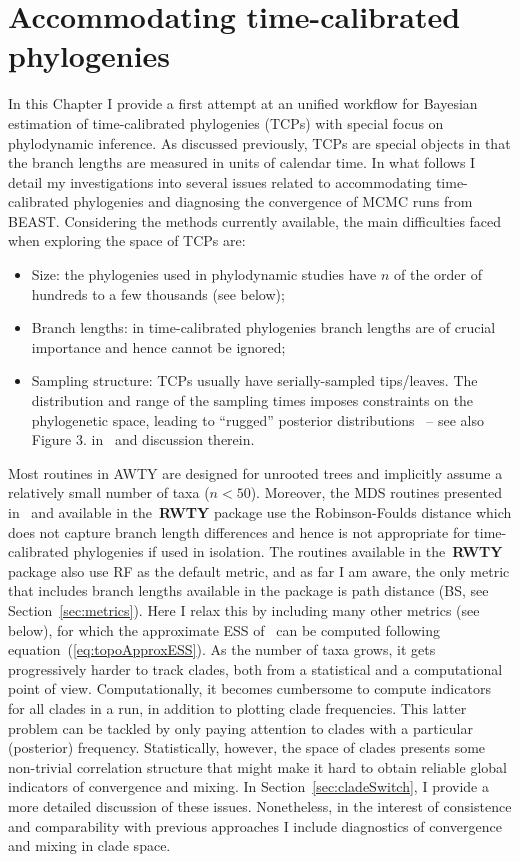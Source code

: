 \section{Accommodating time-calibrated phylogenies}
\label{sec:accommodating}

In this Chapter I provide a first attempt at an unified workflow for Bayesian estimation of time-calibrated phylogenies (TCPs) with special focus on phylodynamic inference.
As discussed previously, TCPs are special objects in that the branch lengths are measured in units of calendar time.
In what follows I detail my investigations into several issues related to accommodating time-calibrated phylogenies and diagnosing the convergence of MCMC runs from BEAST.
Considering the methods currently available, the main difficulties faced when exploring the space of TCPs are:
\begin{itemize}
 \item Size: the phylogenies used in phylodynamic studies have $n$ of the order of hundreds to a few thousands (see below);
 \item Branch lengths: in time-calibrated phylogenies branch lengths are of crucial importance and hence cannot be ignored;
 \item Sampling structure: TCPs usually have serially-sampled tips/leaves.
 The distribution and range of the sampling times imposes constraints on the phylogenetic space, leading to ``rugged'' posterior distributions~\citep{Brown2018} -- see also Figure 3. in~\cite{Moller2018} and discussion therein. 
\end{itemize}

Most routines in AWTY are designed for unrooted trees and implicitly assume a relatively small number of taxa ($n < 50$).
Moreover, the MDS routines presented in~\cite{Hillis2005} and available in the~\textbf{RWTY} package use the Robinson-Foulds distance which does not capture branch length differences and hence is not appropriate for time-calibrated phylogenies if used in isolation.
The routines available in the~\textbf{RWTY} package also use RF as the default metric, and as far I am aware, the only metric that includes branch lengths available in the package is path distance (BS, see Section~\ref{sec:metrics}).
Here I relax this by including many other metrics (see below), for which the approximate ESS of~\cite{Lanfear2016} can be computed following equation~(\ref{eq:topoApproxESS}).
As the number of taxa grows, it gets progressively harder to track clades, both from a statistical and a computational point of view.
Computationally, it becomes cumbersome to compute indicators for all clades in a run, in addition to plotting clade frequencies.
This latter problem can be tackled by only paying attention to clades with a particular (posterior) frequency.
Statistically, however, the space of clades presents some non-trivial correlation structure that might make it hard to obtain reliable global indicators of convergence and mixing.
In Section~\ref{sec:cladeSwitch}, I provide a more detailed discussion of these issues.
Nonetheless, in the interest of consistence and comparability with previous approaches I include diagnostics of convergence and mixing in clade space. 

